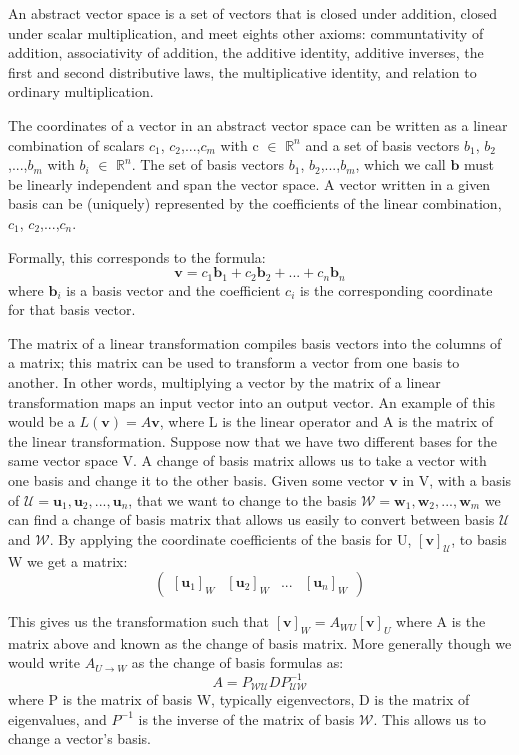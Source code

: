 \hspace*{10mm}

An abstract vector space is a set of vectors that is closed under addition, closed under scalar multiplication, and meet eights other axioms: communtativity of addition, associativity of addition, the additive identity, additive inverses, the first and second distributive laws, the multiplicative identity, and relation to ordinary multiplication.

The coordinates of a vector in an abstract vector space can be written as a linear combination of scalars {$c_1$, $c_2$,...,$c_m$} with c $\in$ $\mathbb{R}^n$ and a set of basis vectors {$b_1$, $b_2$,...,$b_m$} with $b_i$ $\in$ $\mathbb{R}^n$. The set of basis vectors {$b_1$, $b_2$,...,$b_m$}, which we call $\textbf{b}$ must be linearly independent and span the vector space. A vector written in a given basis can be (uniquely) represented by the coefficients of the linear combination, {$c_1$, $c_2$,...,$c_n$}.

Formally, this corresponds to the formula: $$\textbf{v} = c_1 \textbf{b}_1 + c_2 \textbf{b}_2+...+c_n \textbf{b}_n$$ where $\textbf{b}_i$ is a basis vector and the coefficient $c_i$ is the corresponding coordinate for that basis vector.


The matrix of a linear transformation compiles basis vectors into the columns of a matrix; this matrix can be used to transform a vector from one basis to another. In other words, multiplying a vector by the matrix of a linear transformation maps an input vector into an output vector. An example of this would be a $L(\textbf{v}) = A\textbf{v}$, where L is the linear operator and A is the matrix of the linear transformation. Suppose now that we have two different bases for the same vector space V. A change of basis matrix allows us to take a vector with one basis and change it to the other basis. Given some vector $\textbf{v}$ in V, with a basis of $\mathcal{U} = {\textbf{u}_1, \textbf{u}_2,...,\textbf{u}_n}$, that we want to change  to the basis $ \mathcal{W} = {\textbf{w}_1, \textbf{w}_2,...,\textbf{w}_m}$ we can find a change of basis matrix that allows us easily to convert between basis $\mathcal{U}$ and $\mathcal{W}$. By applying the coordinate coefficients of the basis for U, $[\textbf{v}]_\mathcal{U}$, to basis W we get a matrix:
$$
\begin{pmatrix}
[\textbf{u}_1]_W & [\textbf{u}_2]_W & ... & [\textbf{u}_n]_W 
\end{pmatrix}
$$

This gives us the transformation such that $[\textbf{v}]_W = A_{WU} [\textbf{v}]_U$ where A is the matrix above and known as the change of basis matrix. More generally though we would write $A_{U\rightarrow W}$ as the change of basis formulas as: 
$$A = P_{\mathcal{WU}}DP_{\mathcal{UW}}^{-1}$$
where P is the matrix of basis W, typically eigenvectors, D is the matrix of eigenvalues, and $P^{-1}$ is the inverse of the matrix of basis $\mathcal{W}$. This allows us to change a vector's basis. 




